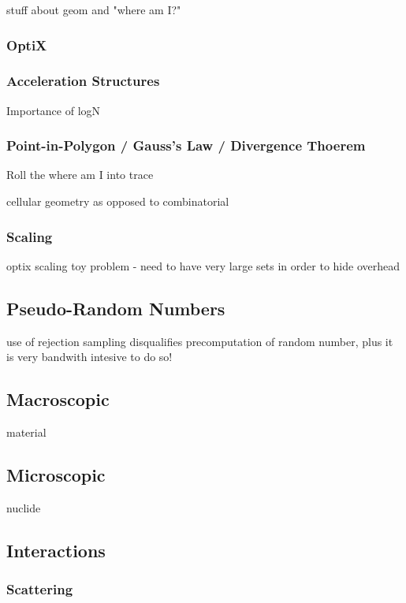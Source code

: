 stuff about geom and "where am I?"

\subsubsection{OptiX}

\subsubsection{Acceleration Structures}

Importance of logN


\subsubsection{Point-in-Polygon / Gauss's Law / Divergence Thoerem}

Roll the where am I into  trace

cellular geometry as opposed to combinatorial


\subsubsection{Scaling}

optix scaling toy problem - need to have very large sets in order to hide overhead


\subsection{Pseudo-Random Numbers}

use of rejection sampling disqualifies precomputation of random number, plus it is very bandwith intesive to do so!

\subsection{Macroscopic}

material

\subsection{Microscopic}

nuclide

\subsection{Interactions}

\subsubsection{Scattering}

